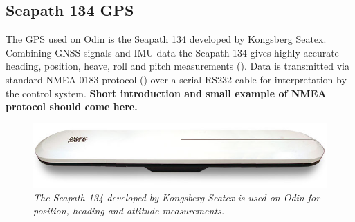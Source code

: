 \subsection{Seapath 134 GPS}
The GPS used on Odin is the Seapath 134 developed by Kongsberg Seatex. Combining GNSS signals and IMU data the Seapath 134 gives highly accurate heading, position, heave, roll and pitch measurements (\cite{SeapathManual}). Data is transmitted via standard NMEA 0183 protocol (\cite{NMEAmanual}) over a serial RS232 cable for interpretation by the control system. \textbf{Short introduction and small example of NMEA protocol should come here.}

\begin{figure}[H]
	\begin{center}
		\includegraphics[width = 0.7\linewidth]{fig/Seapath130.jpg}
		\caption{\textit{The Seapath 134 developed by Kongsberg Seatex is used on Odin for position, heading and attitude measurements.}}
		\label{fig:seapath130}
	\end{center}
\end{figure}

